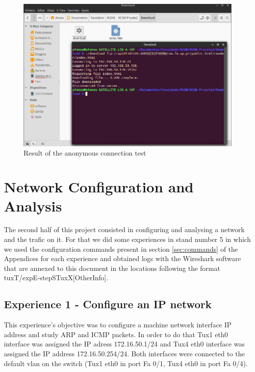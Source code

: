 \documentclass[11pt,a4paper,reqno]{article}
\numberwithin{equation}{section}
\begin{document}
\begin{figure}[p]
\centering
\includegraphics[scale=0.5]{anontest.png}
\caption{Result of the anonymous connection test}
\label{fig:anonconnection}
\end{figure}

\section{Network Configuration and Analysis}

The second half of this project consisted in configuring and analysing a network and the trafic on it. For that we did some experiences in stand number 5 in which we
used the configuration commands present in section \ref{sec:commands} of the Appendices for each experience and obtained logs with the Wireshark software that are annexed to this document
in the locations following the format tuxT/expE-stepSTuxX[OtherInfo].

\subsection{Experience 1 - Configure an IP network}

This experience’s objective was to configure a machine network interface IP address and study ARP and ICMP packets. In order to do that Tux1 eth0 interface was assigned the IP adress 172.16.50.1/24 and Tux4 eth0 interface was assigned the IP address 172.16.50.254/24. Both interfaces were connected to the default vlan on the switch (Tux1 eth0 in port Fa 0/1, Tux4 eth0 in port Fa 0/4).
\end{document}
